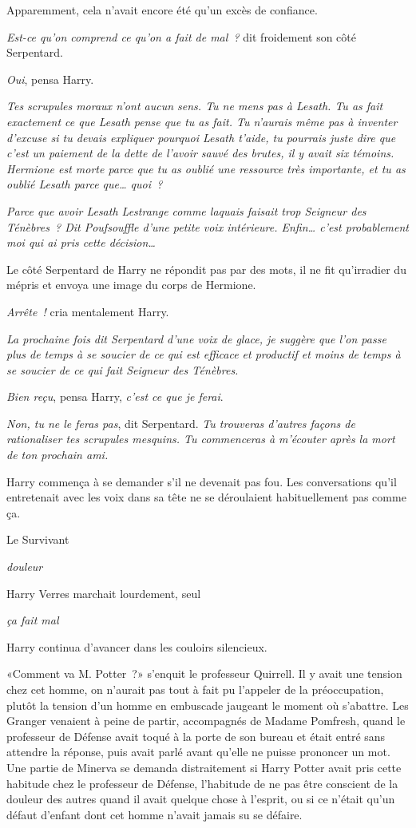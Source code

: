 Apparemment, cela n'avait encore été qu'un excès de confiance.

\emph{Est-ce qu'on comprend ce qu'on a fait de mal~?} dit froidement son côté Serpentard.

\emph{Oui}, pensa Harry.

\emph{Tes scrupules moraux n'ont aucun sens. Tu ne mens pas à Lesath. Tu as fait exactement ce que Lesath pense que tu as fait. Tu n'aurais même pas à inventer d'excuse si tu devais expliquer pourquoi Lesath t'aide, tu pourrais juste dire que c'est un paiement de la dette de l'avoir sauvé des brutes, il y avait six témoins. Hermione est morte parce que tu as oublié une ressource très importante, et tu as oublié Lesath parce que… quoi~?}

\emph{Parce que avoir Lesath Lestrange comme laquais faisait trop Seigneur des Ténèbres~? Dit Poufsouffle d'une petite voix intérieure. Enfin… c'est probablement moi qui ai pris cette décision…}

Le côté Serpentard de Harry ne répondit pas par des mots, il ne fit qu'irradier du mépris et envoya une image du corps de Hermione.

\emph{Arrête~!} cria mentalement Harry.

\emph{La prochaine fois dit Serpentard d'une voix de glace, je suggère que l'on passe plus de temps à se soucier de ce qui est efficace et productif et moins de temps à se soucier de ce qui fait Seigneur des Ténèbres.}

\emph{Bien reçu}, pensa Harry, \emph{c'est ce que je ferai}.

\emph{Non, tu ne le feras pas}, dit Serpentard. \emph{Tu trouveras d'autres façons de rationaliser tes scrupules mesquins. Tu commenceras à m'écouter après la mort de ton prochain ami.}

Harry commença à se demander s'il ne devenait pas fou. Les conversations qu'il entretenait avec les voix dans sa tête ne se déroulaient habituellement pas comme ça.

Le Survivant

\emph{douleur}

Harry Verres marchait lourdement, seul

\emph{ça fait mal}

Harry continua d'avancer dans les couloirs silencieux.

\later

«Comment va M. Potter~?» s'enquit le professeur Quirrell. Il y avait une tension chez cet homme, on n'aurait pas tout à fait pu l'appeler de la préoccupation, plutôt la tension d'un homme en embuscade jaugeant le moment où s'abattre. Les Granger venaient à peine de partir, accompagnés de Madame Pomfresh, quand le professeur de Défense avait toqué à la porte de son bureau et était entré sans attendre la réponse, puis avait parlé avant qu'elle ne puisse prononcer un mot. Une partie de Minerva se demanda distraitement si Harry Potter avait pris cette habitude chez le professeur de Défense, l'habitude de ne pas être conscient de la douleur des autres quand il avait quelque chose à l'esprit, ou si ce n'était qu'un défaut d'enfant dont cet homme n'avait jamais su se défaire.

